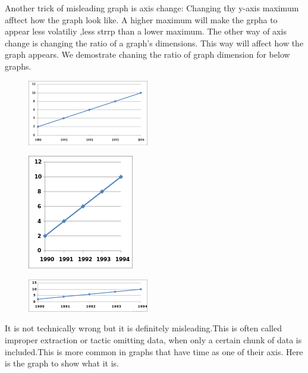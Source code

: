 \documentclass[]{book}
\theoremstyle{definition}
\theoremstyle{definition}
\theoremstyle{definition}
\theoremstyle{remark}
\begin{document}
Another trick of misleading graph is axis change: Changing thy y-axis
maximum afftect how the graph look like. A higher maximum will make the
grpha to appear less volatiliy ,less strrp than a lower maximum. The
other way of axis change is changing the ratio of a graph's dimensions.
This way will affect how the graph appears. We demostrate chaning the
ratio of graph dimension for below graphs.

\begin{figure}
\centering
\includegraphics{images/Line_graph1.svg.png}
\caption{}
\end{figure}

\begin{figure}
\centering
\includegraphics{images/175px-Line_graph1-3.svg.png}
\caption{}
\end{figure}

\begin{figure}
\centering
\includegraphics{images/200px-Line_graph1-4.svg.png}
\caption{}
\end{figure}

It is not technically wrong but it is definitely misleading.This is
often called improper extraction or tactic omitting data, when only a
certain chunk of data is included.This is more common in graphs that
have time as one of their axis. Here is the graph to show what it is.
\end{document}
